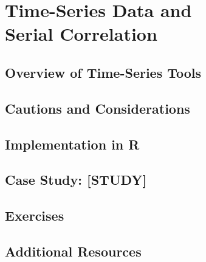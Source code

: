 
\chapter{Time-Series Data and\\ Serial Correlation}

\section{Overview of Time-Series Tools}

\section{Cautions and Considerations}

\section{Implementation in R}

\section{Case Study: [STUDY]}

\section{Exercises}

\section{Additional Resources}
